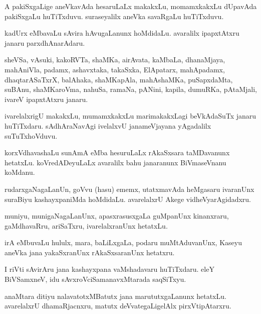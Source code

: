 \documentclass{article}
\begin{document}
\begin{mn}
A pakiSxgaLige aneVkavAda hesaruLaLx makakxLu, momamxkakxLu dUpavAda
pakiSxgaLu huTiTxduvu. suraseyalilx aneVka savaRgaLu huTiTxduvu.
\end{mn}

\begin{mn}%
kadUrx eMbavaLu sAvira hAvugaLanunx hoMdidaLu. avaralilx ipapxtAtxru
janaru parxdhAnarAdaru.
\end{mn}

\begin{mn}%
sheVSa, vAsuki, kakoRVTa, shaMKa, airAvata, kaMbaLa, dhanaMjaya,
mahAniVla, padamx, ashavxtaka, takaSxka, ElApatarx, mahApadamx,
dhaqtarASaTxrX, balAhaka, shaMKapAla, mahAshaMKa, puSapxdaMta, suBAnu,
shaMKaroVma, nahuSa, ramaNa, pANini, kapila, dumuRKa, pAtaMjali,
ivareV ipapxtAtxru janaru.
\end{mn}

\begin{mn}
ivarelalxrigU makakxLu, mumamxkakxLu marimakakxLagi beVkAdaSuTx janaru
huTiTxdaru. sAdhAraNavAgi ivelalxvU janameVjayana yAgadalilx suTuTxhoVduvu.
\end{mn}

\begin{mn}
korxVdhavashaLu sunAmA eMba hesuruLaLx rAkaSxsara taMDavanunx
hetatxLu. koVredADeyuLaLx avaralilx bahu janaranunx BiVmaseVnanu koMdanu.
\end{mn}

\begin{mn}%
rudarxgaNagaLanUn, goVvu (hasu) ememx, utatxmavAda heMgasaru
ivaranUnx suraBiyu kashayxpaniMda hoMdidaLu. avarelalxrU Akege vidheVyarAgidadxru.
\end{mn}

\begin{mn}
muniyu, munigaNagaLanUnx, apasxrasusxgaLa guMpanUnx kinanxraru,
gaMdhavaRru, ariSaTxru, ivarelalxranUnx hetatxLu.
\end{mn}

\begin{mn}
irA eMbuvaLu hululx, mara, baLiLxgaLa, podaru muMtAduvanUnx, Kaseyu
aneVka jana yakaSxranUnx rAkaSxsaranUnx hetatxru.
\end{mn}

\begin{mn}
I riVti sAvirAru jana kashayxpana vaMshadavaru huTiTxdaru. eleY
BiVSamxneV, idu sAvxroVciSamanavxMtarada saqSiTxyu.
\end{mn}

\begin{mn}
anaMtara ditiyu nalavatotxMBatutx jana marututxgaLanunx
hetatxLu. avarelalxrU dhamaRjacnxru, matutx deVvategaLigelAlx pirxVtipAtarxru.
\end{mn}
\end{document}
